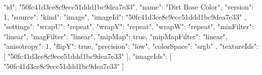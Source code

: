 {
  "id": "50fc41d3ce8c9ecc51ddd1bc9dea7e33",
  "name": "Dirt Base Color",
  "version": 1,
  "source": {
    "kind": "image",
    "imageId": "50fc41d3ce8c9ecc51ddd1bc9dea7e33"
  },
  "settings": {
    "wrapU": "repeat",
    "wrapV": "repeat",
    "wrapW": "repeat",
    "minFilter": "linear",
    "magFilter": "linear",
    "mipMap": true,
    "mipMapFilter": "linear",
    "anisotropy": 1,
    "flipY": true,
    "precision": "low",
    "colorSpace": "srgb"
  },
  "textureIds": [
    "50fc41d3ce8c9ecc51ddd1bc9dea7e33"
  ],
  "imageIds": [
    "50fc41d3ce8c9ecc51ddd1bc9dea7e33"
  ]
}

